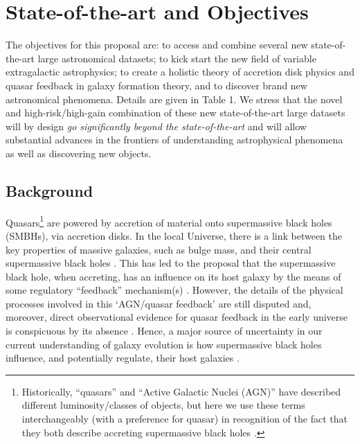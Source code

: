 \section{State-of-the-art and Objectives}
\noindent
The objectives for this proposal are: to access and combine several
new state-of-the-art large astronomical datasets; to kick start the
new field of variable extragalactic astrophysics; to create a holistic
theory of accretion disk physics and quasar feedback in galaxy
formation theory, and to discover brand new astronomical phenomena.
Details are given in Table 1.  We stress that the novel and
high-risk/high-gain combination of these new state-of-the-art large
datasets will by design {\it go significantly beyond the
state-of-the-art} and will allow substantial advances in the frontiers
of understanding astrophysical phenomena as well as discovering new
objects.


\subsection{Background}
\noindent
Quasars\footnote{ Historically, ``quasars'' and ``Active Galactic
Nuclei (AGN)'' have described different luminosity/classes of objects,
but here we use these terms interchangeably (with a preference for
quasar) in recognition of the fact that they both describe accreting
supermassive black holes \citep[e.g.][]{Haardt2016book}.}  are powered
by accretion of material onto supermassive black holes (SMBHs), via
accretion disks.  In the local Universe, there is a link between the
key properties of massive galaxies, such as bulge mass, and their
central supermassive black holes \citep[e.g., ][]{McLure_Dunlop2002,
HaringRix2004, Salviander2007, Greene2010, KormendyHo2013}. This has
led to the proposal that the supermassive black hole, when accreting,
has an influence on its host galaxy by the means of some regulatory
``feedback'' mechanism(s) \citep[e.g., ][]{Sijacki2007, Hopkins2008a,
AlexanderHickox2012, Fabian2012, KingPounds2015}. However, the details
of the physical processes involved in this `AGN/quasar feedback' are
still disputed and, moreover, direct observational evidence for quasar
feedback in the early universe is conspicuous by its absence
\citep[e.g., ][]{HeckmanBest2014, NaabOstriker2017}. Hence, a major
source of uncertainty in our current understanding of galaxy evolution
is how supermassive black holes influence, and potentially regulate,
their host galaxies \citep{Vogelsberger2013, Vogelsberger2014,
Schaye2015, Angles-Alcazar2013, Angles-Alcazar2017}.

